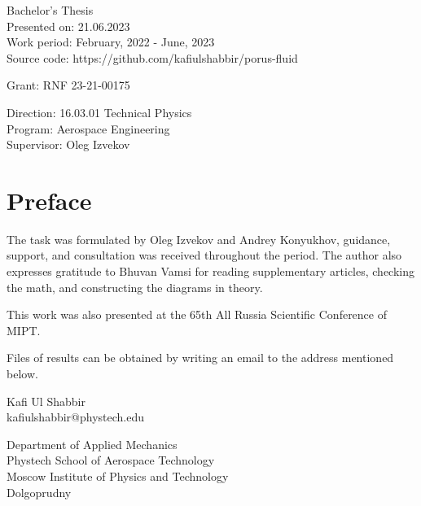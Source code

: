 Bachelor's Thesis \\
Presented on: 21.06.2023 \\
Work period: February, 2022 - June, 2023 \\
Source code: https://github.com/kafiulshabbir/porus-fluid

Grant: RNF 23-21-00175

Direction: 16.03.01 Technical Physics \\
Program: Aerospace Engineering \\
Supervisor: Oleg Izvekov \\

\section*{Preface}
	The task was formulated by Oleg Izvekov and Andrey Konyukhov, guidance, support, and consultation was received throughout the period. The author also expresses gratitude to Bhuvan Vamsi for reading supplementary articles, checking the math, and constructing the diagrams in theory.

	This work was also presented at the 65th All Russia Scientific Conference of MIPT.

	Files of results can be obtained by writing an email to the address mentioned below.

	Kafi Ul Shabbir \\
	kafiulshabbir@phystech.edu
	
	Department of Applied Mechanics \\
	Phystech School of Aerospace Technology \\ 
	Moscow Institute of Physics and Technology \\ 
	Dolgoprudny
